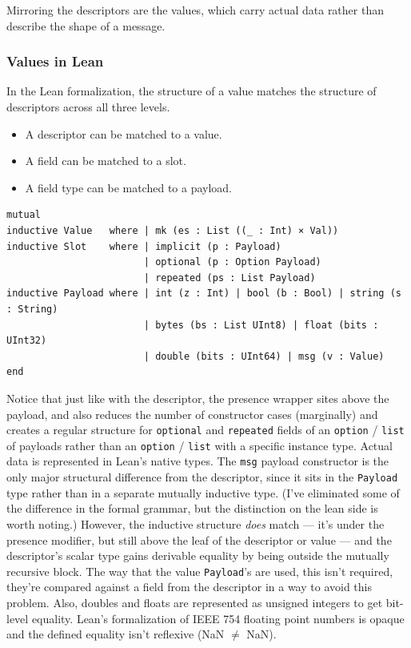 Mirroring the descriptors are the values, which carry actual data rather than
describe the shape of a message.

\subsubsection{Values in Lean}

In the Lean formalization, the structure of a value matches the structure of
descriptors across all three levels.

\begin{itemize}
\item A descriptor can be matched to a value.
\item A field can be matched to a slot.
\item A field type can be matched to a payload.
\end{itemize}

\begin{verbatim}
mutual
inductive Value   where | mk (es : List ((_ : Int) × Val))
inductive Slot    where | implicit (p : Payload)
                        | optional (p : Option Payload)
                        | repeated (ps : List Payload)
inductive Payload where | int (z : Int) | bool (b : Bool) | string (s : String)
                        | bytes (bs : List UInt8) | float (bits : UInt32)
                        | double (bits : UInt64) | msg (v : Value)
end
\end{verbatim}

Notice that just like with the descriptor, the presence wrapper sites above the
payload, and also reduces the number of constructor cases (marginally) and
creates a regular structure for \texttt{optional} and \texttt{repeated} fields
of an \texttt{option} / \texttt{list} of payloads rather than an \texttt{option}
/ \texttt{list} with a specific instance type. Actual data is represented in
Lean's native types. The \texttt{msg} payload constructor is the only major
structural difference from the descriptor, since it sits in the \texttt{Payload}
type rather than in a separate mutually inductive type. (I've eliminated some of
the difference in the formal grammar, but the distinction on the lean side is
worth noting.) However, the inductive structure \emph{does} match --- it's
under the presence modifier, but still above the leaf of the descriptor or value
--- and the descriptor's scalar type gains derivable equality by being outside the
mutually recursive block. The way that the value \texttt{Payload}'s are used,
this isn't required, they're compared against a field from the descriptor in a
way to avoid this problem. Also, doubles and floats are represented as unsigned
integers to get bit-level equality. Lean's formalization of IEEE 754 floating
point numbers is opaque and the defined equality isn't reflexive (NaN $\ne$ NaN). 

